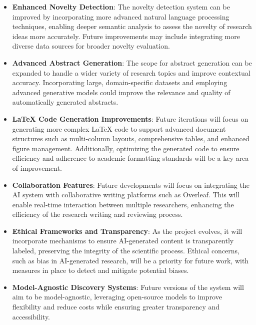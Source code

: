 \begin{itemize}
    \item \textbf{Enhanced Novelty Detection}: The novelty detection system can be improved by incorporating more advanced natural language processing techniques, enabling deeper semantic analysis to assess the novelty of research ideas more accurately. Future improvements may include integrating more diverse data sources for broader novelty evaluation.
    
    \item \textbf{Advanced Abstract Generation}: The scope for abstract generation can be expanded to handle a wider variety of research topics and improve contextual accuracy. Incorporating large, domain-specific datasets and employing advanced generative models could improve the relevance and quality of automatically generated abstracts.
    
    \item \textbf{LaTeX Code Generation Improvements}: Future iterations will focus on generating more complex LaTeX code to support advanced document structures such as multi-column layouts, comprehensive tables, and enhanced figure management. Additionally, optimizing the generated code to ensure efficiency and adherence to academic formatting standards will be a key area of improvement.
    
    \item \textbf{Collaboration Features}: Future developments will focus on integrating the AI system with collaborative writing platforms such as Overleaf. This will enable real-time interaction between multiple researchers, enhancing the efficiency of the research writing and reviewing process.
    
    \item \textbf{Ethical Frameworks and Transparency}: As the project evolves, it will incorporate mechanisms to ensure AI-generated content is transparently labeled, preserving the integrity of the scientific process. Ethical concerns, such as bias in AI-generated research, will be a priority for future work, with measures in place to detect and mitigate potential biases.
    
    \item \textbf{Model-Agnostic Discovery Systems}: Future versions of the system will aim to be model-agnostic, leveraging open-source models to improve flexibility and reduce costs while ensuring greater transparency and accessibility.
\end{itemize}

